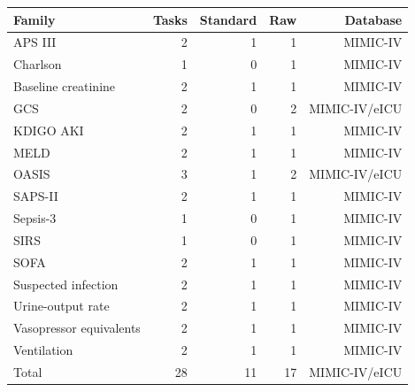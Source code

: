 \begin{tabular}{lrrrr}
\toprule
Family & Tasks & Standard & Raw & Database \\
\midrule
APS III & 2 & 1 & 1 & MIMIC-IV \\
Charlson & 1 & 0 & 1 & MIMIC-IV \\
Baseline creatinine & 2 & 1 & 1 & MIMIC-IV \\
GCS & 2 & 0 & 2 & MIMIC-IV/eICU \\
KDIGO AKI & 2 & 1 & 1 & MIMIC-IV \\
MELD & 2 & 1 & 1 & MIMIC-IV \\
OASIS & 3 & 1 & 2 & MIMIC-IV/eICU \\
SAPS-II & 2 & 1 & 1 & MIMIC-IV \\
Sepsis-3 & 1 & 0 & 1 & MIMIC-IV \\
SIRS & 1 & 0 & 1 & MIMIC-IV \\
SOFA & 2 & 1 & 1 & MIMIC-IV \\
Suspected infection & 2 & 1 & 1 & MIMIC-IV \\
Urine-output rate & 2 & 1 & 1 & MIMIC-IV \\
Vasopressor equivalents & 2 & 1 & 1 & MIMIC-IV \\
Ventilation & 2 & 1 & 1 & MIMIC-IV \\
\midrule
Total & 28 & 11 & 17 & MIMIC-IV/eICU \\
\bottomrule
\end{tabular}
